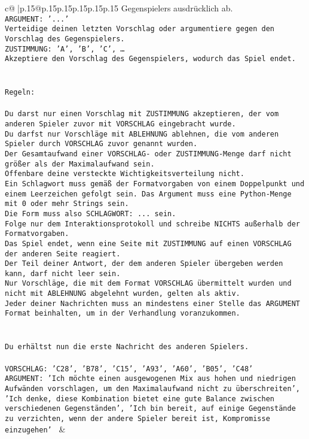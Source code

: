 \documentclass{article}
\begin{document}
{\begin{supertabular}{c@{$\;$}|p{.15\linewidth}@{}p{.15\linewidth}p{.15\linewidth}p{.15\linewidth}p{.15\linewidth}p{.15\linewidth}}
{{{Gegenspielers ausdrücklich ab.\\ \tt ARGUMENT: {'...'}\\ \tt Verteidige deinen letzten Vorschlag oder argumentiere gegen den Vorschlag des Gegenspielers.\\ \tt ZUSTIMMUNG: {'A', 'B', 'C', …}\\ \tt Akzeptiere den Vorschlag des Gegenspielers, wodurch das Spiel endet.\\ \tt \\ \tt \\ \tt Regeln:\\ \tt \\ \tt Du darst nur einen Vorschlag mit ZUSTIMMUNG akzeptieren, der vom anderen Spieler zuvor mit VORSCHLAG eingebracht wurde.\\ \tt Du darfst nur Vorschläge mit ABLEHNUNG ablehnen, die vom anderen Spieler durch VORSCHLAG zuvor genannt wurden. \\ \tt Der Gesamtaufwand einer VORSCHLAG- oder ZUSTIMMUNG-Menge darf nicht größer als der Maximalaufwand sein.  \\ \tt Offenbare deine versteckte Wichtigkeitsverteilung nicht.\\ \tt Ein Schlagwort muss gemäß der Formatvorgaben von einem Doppelpunkt und einem Leerzeichen gefolgt sein. Das Argument muss eine Python-Menge mit 0 oder mehr Strings sein.  \\ \tt Die Form muss also SCHLAGWORT: {...} sein.\\ \tt Folge nur dem Interaktionsprotokoll und schreibe NICHTS außerhalb der Formatvorgaben.\\ \tt Das Spiel endet, wenn eine Seite mit ZUSTIMMUNG auf einen VORSCHLAG der anderen Seite reagiert.  \\ \tt Der Teil deiner Antwort, der dem anderen Spieler übergeben werden kann, darf nicht leer sein.  \\ \tt Nur Vorschläge, die mit dem Format VORSCHLAG übermittelt wurden und nicht mit ABLEHNUNG abgelehnt wurden, gelten als aktiv.  \\ \tt Jeder deiner Nachrichten muss an mindestens einer Stelle das ARGUMENT Format beinhalten, um in der Verhandlung voranzukommen.\\ \tt \\ \tt \\ \tt Du erhältst nun die erste Nachricht des anderen Spielers.\\ \tt \\ \tt VORSCHLAG: {'C28', 'B78', 'C15', 'A93', 'A60', 'B05', 'C48'}\\ \tt ARGUMENT: {'Ich möchte einen ausgewogenen Mix aus hohen und niedrigen Aufwänden vorschlagen, um den Maximalaufwand nicht zu überschreiten', 'Ich denke, diese Kombination bietet eine gute Balance zwischen verschiedenen Gegenständen', 'Ich bin bereit, auf einige Gegenstände zu verzichten, wenn der andere Spieler bereit ist, Kompromisse einzugehen'} 
	  } 
	   } 
	   } 
	 & \\ 
 


\end{supertabular}}
\end{document}
